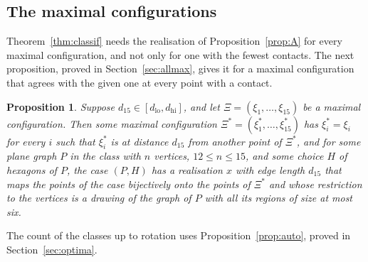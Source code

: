 \documentclass[12pt]{amsart}
\theoremstyle{definition}
\newcounter{mainthm}
\theoremstyle{plain}
\newtheorem{mainproposition}[mainthm]{Proposition}
\theoremstyle{definition}
\newcommand{\dlo}{d_{\mathrm{lo}}}
\newcommand{\dhi}{d_{\mathrm{hi}}}
\newcommand{\leanmap}[1]{\ignorespaces}
\newcommand{\mapnote}[1]{\ignorespaces}
\begin{document}
\subsection{The maximal configurations}\label{sec:classif}
Theorem~\ref{thm:classif} needs the realisation of Proposition~\ref{prop:A} for every maximal configuration, and not only for one with the fewest contacts. The next proposition, proved in Section~\ref{sec:allmax}, gives it for a maximal configuration that agrees with the given one at every point with a contact.

\begin{mainproposition}\label{prop:D}\leanmap{Tammes15.exists_unshiftable, Tammes15.structured_of_unshiftable, Tammes15.realisation_of_structured_pts, Tammes15.D2Regions.planeClass_of_structured}\mapnote{for fifteen labelled points at pairwise distance at least $d_{15}$, as steps of the proof of the first declaration of Theorem \ref{thm:classif}: the first declaration gives $\Xi^*$, the second the conclusions of Theorem \ref{thm:structure} for $\Xi^*$ in the form of \texttt{Tammes15.Structured}, the third the realisation with the bijection onto the points of $\Xi^*$, and the fourth the class of D2 on the drawing}
Suppose $d_{15}\in[\dlo,\dhi]$, and let $\Xi=(\xi_1,\dots,\xi_{15})$ be a maximal configuration. Then some maximal configuration $\Xi^*=(\xi^*_1,\dots,\xi^*_{15})$ has $\xi^*_i=\xi_i$ for every $i$ such that $\xi^*_i$ is at distance $d_{15}$ from another point of $\Xi^*$, and for some plane graph $P$ in the class with $n$ vertices, $12\le n\le15$, and some choice $H$ of hexagons of $P$, the case $(P,H)$ has a realisation $x$ with edge length $d_{15}$ that maps the points of the case bijectively onto the points of $\Xi^*$ and whose restriction to the vertices is a drawing of the graph of $P$ with all its regions of size at most six.
\end{mainproposition}

The count of the classes up to rotation uses Proposition~\ref{prop:auto}, proved in Section~\ref{sec:optima}.
\end{document}
